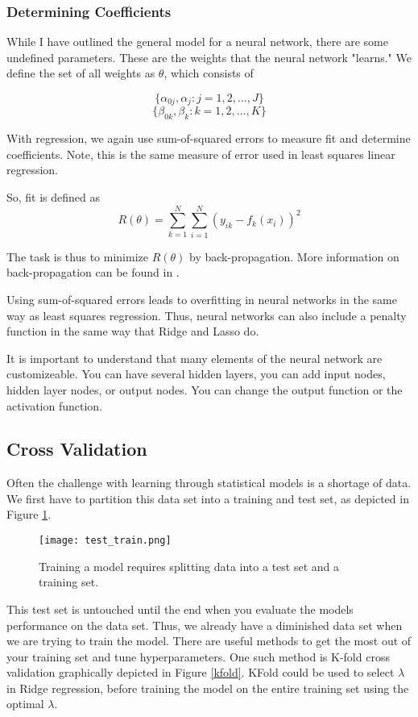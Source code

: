 \documentclass[12pt]{article}
\begin{document}
\subsubsection{Determining Coefficients}
While I have outlined the general model for a neural network, there are some undefined parameters. These are the weights that the neural network "learns." We define the set of all weights as $\theta$, which consists of 

$$\{\alpha_{0j}, \alpha_j: j = 1, 2, \dots, J\}$$
$$\{\beta_{0k}, \beta_k:  k= 1, 2, \dots, K\}$$

With regression, we again use sum-of-squared errors to measure fit and determine coefficients. Note, this is the same measure of error used in least squares linear regression.

So, fit is defined as 
$$R(\theta) = \sum_{k=1}^{N} \sum_{i=1}^{N} (y_{ik} - f_k(x_i))^2$$ 

The task is thus to minimize $R(\theta)$ by back-propagation. More information on back-propagation can be found in \cite[354]{springer}. 

Using sum-of-squared errors leads to overfitting in neural networks in the same way as least squares regression. Thus, neural networks can also include a penalty function in the same way that Ridge and Lasso do. 

It is important to understand that many elements of the neural network are customizeable. You can have several hidden layers, you can add input nodes, hidden layer nodes, or output nodes. You can change the output function or the activation function. 
\subsection{Cross Validation}
Often the challenge with learning through statistical models is a shortage of data. We first have to partition this data set into a training and test set, as depicted in Figure \ref{test_train}.

\begin{figure}[ht]
	\centering
	\texttt{[image: test\_train.png]}
	\caption{Training a model requires splitting data into a test set and a training set. \cite{kfold}}
	\label{test_train}
\end{figure}

This test set is untouched until the end when you evaluate the models performance on the data set. Thus, we already have a diminished data set when we are trying to train the model. There are useful methods to get the most out of your training set and tune hyperparameters. One such method is K-fold cross validation graphically depicted in Figure \ref{kfold}. KFold could be used to select $\lambda$ in Ridge regression, before training the model on the entire training set using the optimal $\lambda$.
\end{document}
